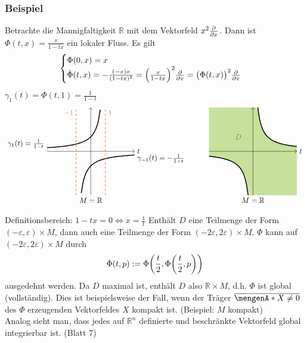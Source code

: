 \subsubsection{Beispiel} %
\label{sub:259}
Betrachte die Mannigfaltigkeit $\mathds{R}$ mit dem Vektorfeld $x^2 \frac{{\partial }}{{\partial x}} $. Dann ist $\Phi (t,x) = \frac{x}{1- tx}$ ein lokaler Fluss. Es gilt
\[
	\begin{cases}
		\Phi (0,x) = x \\
		\dot{\Phi}(t,x) = - \frac{(-x) x}{(1-tx)^2} = \enbrace*{\frac{x}{1-tx} }^2 \diff{}{x} = \enbrace[\big]{\Phi(t,x)}^2 \diff{}{x}     
	\end{cases}
\]
$\gamma_1(t)= \Phi(t,1)= \frac{1}{1-t} $
\[
	\begin{tikzpicture}[scale=0.7]
		\draw[->] (-3,0) -- (3,0) node[right]{$t$};
		\draw[->] (0,-3) node[below]{$M=\mathds{R}$} -- (0,3);
		\draw[variable=\t, domain=-3:0.65, very thick, smooth] plot ({\t}, {1 /(1-\t)});
		\draw[variable=\t, domain=-0.65:3, very thick, smooth] plot ({\t}, {-1 /(1+\t)});
		\node[left] at (-3,0.5) {$\gamma_1(t)= \frac{1}{1-t} $};
		\node[right] at(3,-0.5) {$\gamma_{-1}(t)= -\frac{1}{1+t}$};
		\draw[dashed, Sienna2, thick] (-1,-3) -- (-1,3) node[below left]{$-1$};
		\draw[dashed, Sienna2, thick] (1,-3) -- (1,3) node[below right]{$1$};
	\end{tikzpicture} \qquad \quad 
	\begin{tikzpicture}[scale=0.7]
		\draw[variable=\t, very thin, fill, DarkOliveGreen3!60] plot[domain=0.333:3] (\t, 1/\t) -- (3,-3) -- plot[domain=-0.333:-3] (\t, 1/\t) -- (-3,3) -- cycle;
		\draw[variable=\t, very thick] plot[domain=0.333:3] (\t, 1/\t)  plot[domain=-0.333:-3] (\t, 1/\t) ;
		\draw[->] (-3,0) -- (3,0) node[right]{$t$};
		\draw[->] (0,-3) node[below]{$M=\mathds{R}$} -- (0,3);
		\node[DarkOliveGreen4] at (-1,1) {$D$};
	\end{tikzpicture}
\]
Definitionsbereich: $1-tx = 0 \Leftrightarrow x = \frac{1}{t}$ 
Enthält $D$ eine Teilmenge der Form $(-\varepsilon, \varepsilon) \times M$, dann auch eine Teilmenge der Form $(-2 \varepsilon, 2 \varepsilon) \times M$.
$\Phi $ kann auf $(-2 \varepsilon, 2 \varepsilon) \times M$ durch
\[
	\Phi(t,p) := \Phi \enbrace*{\frac{t}{2}, \Phi \enbrace*{\frac{t}{2}, p }  } 
\]
ausgedehnt werden. Da $D$ maximal ist, enthält $D$ also $\mathds{R} \times M$, d.h. $\Phi $ ist global (vollständig). Dies ist beispielsweise der Fall, wenn der Träger 
$\overline{\set{X \not= 0}}$ des $\Phi$ erzeugenden Vektorfeldes $X$ kompakt ist. (Beispiel: $M$ kompakt) \\
Analog sieht man, dass jedes auf $\mathds{R}^n$ definierte und beschränkte Vektorfeld global integrierbar ist. (Blatt 7)

